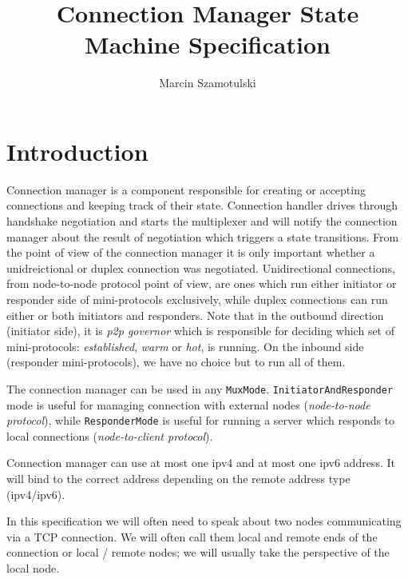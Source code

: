 \documentclass{article}
\title{Connection Manager State Machine Specification}
\author{Marcin Szamotulski}
\def\TCP{\textsf{TCP}}
\def\ipvfour{\textsf{ipv4}}
\def\ipvsix{\textsf{ipv6}}
\def\warm{\textit{warm}}
\def\hot{\textit{hot}}
\def\established{\textit{established}}
\def\ptopgov{\textit{p2p governor}}
\begin{document}
\nocite{*}
\maketitle

\section{Introduction}
Connection manager is a component responsible for creating or accepting connections and keeping
track of their state.  Connection handler drives through handshake negotiation
and starts the multiplexer and will notify the connection manager about the
result of negotiation which triggers a state transitions.  From the point of
view of the connection manager it is only important whether a unidreictional
or duplex connection was negotiated.  Unidirectional connections, from
node-to-node protocol point of view, are ones which run either initiator or
responder side of mini-protocols exclusively, while duplex connections can run
either or both initiators and responders.  Note that in the outbound direction
(initiator side), it is \ptopgov{} which is responsible for deciding which set
of mini-protocols: \established{}, \warm{} or \hot{}, is running.  On the
inbound side (responder mini-protocols), we have no choice but to run all of
them.

The connection manager can be used in any \texttt{MuxMode}.
\texttt{InitiatorAndResponder} mode is useful for managing connection with
external nodes (\textit{node-to-node protocol}), while \texttt{ResponderMode}
is useful for running a server which responds to local connections
(\textit{node-to-client protocol}).

Connection manager can use at most one \ipvfour{} and at most one \ipvsix{}
address.  It will bind to the correct address depending on the remote address
type (\ipvfour{}/\ipvsix{}).

In this specification we will often need to speak about two nodes communicating
via a \TCP{} connection.  We will often call them local and remote ends of the
connection or local \slash{} remote nodes; we will usually take the
perspective of the local node.
\end{document}
